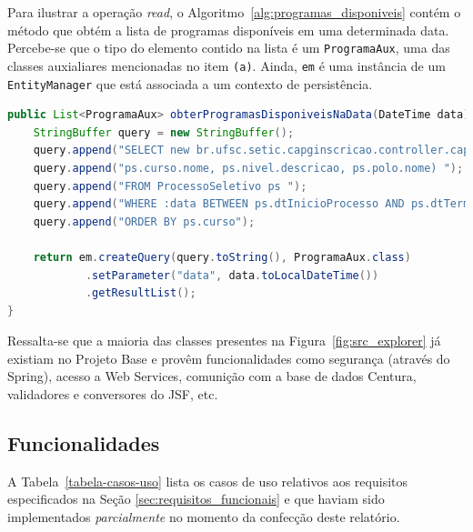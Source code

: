 \documentclass[
  10.5pt,				  %
	openright,			%
	twoside,			  %
  a5paper,
  chapter=TITLE,	%
	section=TITLE,	%
  hyphens,        %
	english,        %
	brazil          %
]{abntex2}
\begin{document}
Para ilustrar a operação \emph{read}, o Algoritmo~\ref{alg:programas_disponiveis} contém o método que obtém a lista de programas disponíveis em uma determinada data. Percebe-se que o tipo do elemento contido na lista é um \texttt{ProgramaAux}, uma das classes auxialiares mencionadas no item \texttt{(a)}. Ainda, \texttt{em} é uma instância de um \texttt{EntityManager} que está associada a um contexto de persistência.

\begin{landscape}
\begin{lstlisting}[language=java, caption={Obtenção da lista de programas disponíveis.}, label={alg:programas_disponiveis}]
public List<ProgramaAux> obterProgramasDisponiveisNaData(DateTime data) {
    StringBuffer query = new StringBuffer();
    query.append("SELECT new br.ufsc.setic.capginscricao.controller.capg.ProgramaAux(");
    query.append("ps.curso.nome, ps.nivel.descricao, ps.polo.nome) ");
    query.append("FROM ProcessoSeletivo ps ");
    query.append("WHERE :data BETWEEN ps.dtInicioProcesso AND ps.dtTerminoProcesso ");
    query.append("ORDER BY ps.curso");

    return em.createQuery(query.toString(), ProgramaAux.class)
            .setParameter("data", data.toLocalDateTime())
            .getResultList();
}
\end{lstlisting}
\end{landscape}

Ressalta-se que a maioria das classes presentes na Figura~\ref{fig:src_explorer} já existiam no Projeto Base e provêm funcionalidades como segurança (através do Spring), acesso a Web Services, comunição com a base de dados Centura, validadores e conversores do JSF, etc.

\subsection{Funcionalidades}

A Tabela~\ref{tabela-casos-uso} lista os casos de uso relativos aos requisitos especificados na Seção \ref{sec:requisitos_funcionais} e que haviam sido implementados \emph{parcialmente} no momento da confecção deste relatório.
\end{document}
